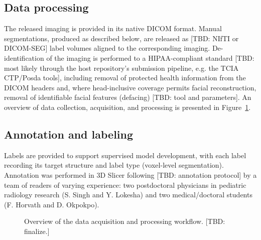 \subsection*{Data processing}\label{subsec:curation}
The released imaging is provided in its native DICOM format.
Manual segmentations, produced as described below, are released as [TBD: NIfTI or DICOM-SEG] label volumes aligned to the corresponding imaging.
De-identification of the imaging is performed to a HIPAA-compliant standard [TBD: most likely through the host repository's submission pipeline, e.g. the TCIA CTP/Posda tools], including removal of protected health information from the DICOM headers and, where head-inclusive coverage permits facial reconstruction, removal of identifiable facial features (defacing) [TBD: tool and parameters].
An overview of data collection, acquisition, and processing is presented in Figure~\ref{fig:workflow}.

\subsection*{Annotation and labeling}\label{subsec:annotation}
Labels are provided to support supervised model development, with each label recording its target structure and label type (voxel-level segmentation).
Annotation was performed in 3D Slicer following [TBD: annotation protocol] by a team of readers of varying experience: two postdoctoral physicians in pediatric radiology research (S. Singh and Y. Lokesha) and two medical/doctoral students (F. Horvath and D. Okpokpo).

\begin{figure}[t]
\centering
{}
\caption{Overview of the data acquisition and processing workflow. [TBD: finalize.]}
\label{fig:workflow}
\end{figure}
